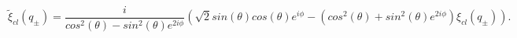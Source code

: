 \begin{equation}
\label{psi}
{\widetilde \xi}_{cl}(q_{\pm}) =
\frac{i}{cos^2(\theta)-sin^2(\theta)e^{2i\phi}}
(\sqrt{2}sin(\theta)cos(\theta)e^{i\phi} -
(cos^2(\theta)+sin^2(\theta)e^{2i\phi})\xi_{cl}(q_{\pm})).
\end{equation}

